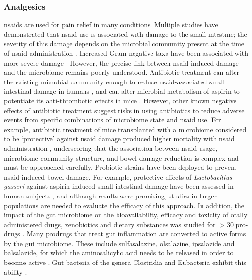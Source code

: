 \subsubsection{Analgesics}
\Glspl{nsaid} are used for pain relief in many conditions. Multiple studies have demonstrated that \gls{nsaid} use is associated with damage to the small intestine; the severity of this damage depends on the microbial community present at the time of \gls{nsaid} administration \cite{RN4107, RN4109}. Increased Gram-negative taxa have been associated with more severe damage \cite{RN4109, RN4124}. However, the precise link between \gls{nsaid}-induced damage and the microbiome remains poorly understood. Antibiotic treatment can alter the existing microbial community enough to reduce \gls{nsaid}-associated small intestinal damage in humans \cite{RN4085}, and can alter microbial metabolism of aspirin to potentiate its anti-thrombotic effects in mice \cite{RN4090}. However, other known negative effects of antibiotic treatment suggest risks in using antibiotics to reduce adverse events from specific combinations of microbiome state and \gls{nsaid} use. For example, antibiotic treatment of mice transplanted with a microbiome considered to be `protective' against \gls{nsaid} damage produced higher mortality with \gls{nsaid} administration \cite{RN4089}, underscoring that the association between \gls{nsaid} usage, microbiome community structure, and bowel damage reduction is complex and must be approached carefully. Probiotic strains have been deployed to prevent \gls{nsaid}-induced bowel damage. For example, protective effects of \textit{Lactobacillus gasseri} against aspirin-induced small intestinal damage have been assessed in human subjects \cite{RN4091}, and although results were promising, studies in larger populations are needed to evaluate the efficacy of this approach. In addition, the impact of the gut microbiome on the bioavailability, efficacy and toxicity of orally administered drugs, xenobiotics and dietary substances was studied for $>$30 pro-drugs \cite{RN4136}. Many prodrugs that treat gut inflammation are converted to active forms by the gut microbiome. These include sulfasalazine, olsalazine, ipsalazide and balsalazide, for which the aminosalicylic acid needs to be released in order to become active \cite{RN4093}. Gut bacteria of the genera Clostridia and Eubacteria exhibit this ability \cite{RN4094}.

